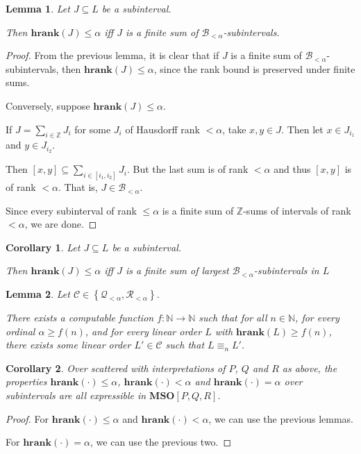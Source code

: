 \documentclass{article}
\newtheorem{corollary}{Corollary}
\newtheorem{lemma}{Lemma}
\newcommand{\braces}[1]{\left\{ {#1} \right\}}
\newcommand{\setcomp}[1]{\braces{#1}}
\newcommand{\hrank}[1]{\mathbf{hrank}\left( #1 \right)}
\newcommand{\mso}{\mathbf{MSO}}
\newcommand{\NN}{\mathbb{N}}
\newcommand{\ZZ}{\mathbb{Z}}
\begin{document}
\begin{lemma}
  Let $J \subseteq L$ be a subinterval.

  Then $\hrank{J} \le \alpha$ iff $J$ is a finite sum of $\mathcal{B}_{< \alpha}$-subintervals.
\end{lemma}

\begin{proof}
  From the previous lemma, it is clear that if $J$ is a finite sum of $\mathcal{B}_{< \alpha}$-subintervals,
  then $\hrank{J} \le \alpha$, since the rank bound is preserved under finite sums.

  Conversely, suppose $\hrank{J} \le \alpha$.

  If $J = \sum_{i \in \ZZ} J_i$ for some $J_i$ of Hausdorff rank $< \alpha$,
  take $x, y \in J$. Then let $x \in J_{i_1}$ and $y \in J_{i_2}$.
  
  Then $[x, y] \subseteq \sum_{i \in [i_1, i_2]} J_i$. But the last sum is of rank $< \alpha$
  and thus $[x, y]$ is of rank $< \alpha$. That is, $J \in \mathcal{B}_{< \alpha}$.

  Since every subinterval of rank $\le \alpha$ is a finite sum of $\ZZ$-sums of intervals of rank $< \alpha$,
  we are done.
\end{proof}

\begin{corollary}
  Let $J \subseteq L$ be a subinterval.

  Then $\hrank{J} \le \alpha$ iff $J$ is a finite sum of largest $\mathcal{B}_{< \alpha}$-subintervals in $L$
\end{corollary}


\begin{lemma}
  Let $\mathcal{C} \in \setcomp{\mathcal{Q}_{< \alpha}, \mathcal{R}_{< \alpha}}$.

  There exists a computable function $f : \NN \to \NN$ such that for all $n \in \NN$,
  for every ordinal $\alpha \ge f(n)$,
  and for every linear order $L$ with $\hrank{L} \ge f(n)$,
  there exists some linear order $L' \in \mathcal{C}$ such that
  $L \equiv_n L'$.
\end{lemma}

\begin{corollary}
  Over scattered with interpretations of $P$, $Q$ and $R$ as above, the properties
  $\hrank{\cdot} \le \alpha$, $\hrank{\cdot} < \alpha$ and $\hrank{\cdot} = \alpha$
  over subintervals are all expressible in $\mso[P, Q, R]$.
\end{corollary}

\begin{proof}
  For $\hrank{\cdot} \le \alpha$ and $\hrank{\cdot} < \alpha$, we can use the previous lemmas.

  For $\hrank{\cdot} = \alpha$, we can use the previous two.
\end{proof}
\end{document}
